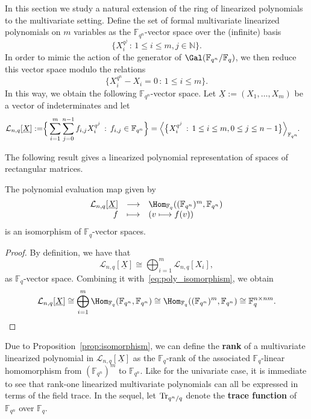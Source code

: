 In this section we study a natural extension of the ring of linearized polynomials to the multivariate setting.  Define the set of formal multivariate linearized polynomials on $m$ variables as the ${\mathbb F}_{q^n}$-vector space over the (infinite) basis
$$ \{X_i^{q^j} \, :\, 1 \leq i \leq m, j \in \mathbb N\}.$$
In order to mimic the action of the generator of $\Gal({\mathbb F}_{q^n}/\mathbb{F}_q)$, we then reduce this vector space modulo the relations 
$$ \{X_i^{q^n}-X_i =0\, : \, 1 \le i \le m \}. $$
In this way, we obtain the following ${\mathbb F}_{q^n}$-vector space.
Let $\underline{X}:=(X_1,\ldots,X_m)$ be a vector of indeterminates and let 
\begin{align*} \mathcal{L}_{n,q}[\underline{X}]:= & \Big\{ \sum_{i=1}^m\sum_{j=0}^{n-1} f_{i,j}X_i^{q^j} \,:\, f_{i,j}\in{\mathbb F}_{q^n} \Big\}
= \left\langle \big\{ X_i^{q^j} \, :\, 1\le i \le m, 0\le j \le n-1\big\} \right\rangle_{{\mathbb F}_{q^n}} \hspace{-0.1cm}.
\end{align*}

The following result gives a linearized polynomial representation of spaces of rectangular matrices.

\begin{prop}\label{prop:isomorphism}
The polynomial evaluation map given by
$$ 
\begin{array}{rcl} 
\mathcal{L}_{n,q}[\underline{X}]&\longrightarrow  &\Hom_{\mathbb{F}_q}(({\mathbb F}_{q^n})^m,{\mathbb F}_{q^n}) \\
 f & \longmapsto & (v \longmapsto f(v))
\end{array}$$
is an isomorphism of $\mathbb{F}_q$-vector spaces.
\end{prop}

\begin{proof}
By definition, we have that
$$\mathcal{L}_{n,q}[\underline{X}]\cong \bigoplus_{i=1}^m\mathcal{L}_{n,q}[X_i],$$
 as $\mathbb{F}_q$-vector space. Combining it with~\eqref{eq:poly_isomorphism}, we obtain
\begin{equation*}\mathcal{L}_{n,q}[\underline{X}]\cong \bigoplus_{i=1}^m \Hom_{\mathbb{F}_q}({\mathbb F}_{q^n},{\mathbb F}_{q^n})\cong \Hom_{\mathbb{F}_q}(({\mathbb F}_{q^n})^m,{\mathbb F}_{q^n}) \cong \mathbb{F}_q^{n \times nm}.
\end{equation*}
\end{proof}

Due to Proposition~\ref{prop:isomorphism}, we can define the \textbf{rank} of a multivariate linearized polynomial in $\mathcal{L}_{n,q}[\underline{X}]$ as the $\mathbb{F}_q$-{rank} of the associated $\mathbb{F}_q$-linear homomorphism from $({\mathbb F}_{q^n})^m$ to ${\mathbb F}_{q^n}$. Like for the univariate case, it is immediate to see that rank-one linearized multivariate polynomials can all be expressed in terms of the field trace. In the sequel, let ${\rm Tr}_{{q^n}/q}$ denote the \textbf{trace function} of ${\mathbb F}_{q^n}$ over $\mathbb{F}_q$.

